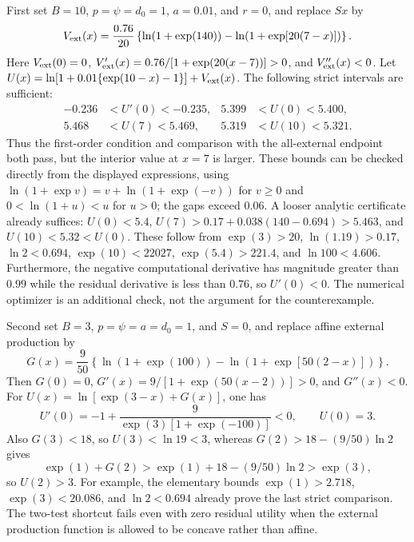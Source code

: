 \documentclass[11pt,a4paper]{article}
\theoremstyle{definition}\newtheorem{definition}{Definition}
\begin{document}
First set $B=10$, $p=\psi=d_0=1$, $a=0.01$, and $r=0$, and replace
$Sx$ by
\[
 V_{\rm ext}(x)=\frac{0.76}{20}
 \left\{\ln(1+\exp(140))-
             \ln(1+\exp[20(7-x)])\right\}.
\]
Here $V_{\rm ext}(0)=0$,
$V_{\rm ext}'(x)=0.76/[1+\exp(20(x-7))]>0$, and
$V_{\rm ext}''(x)<0$. Let
$U(x)=\ln[1+0.01\{\exp(10-x)-1\}]+V_{\rm ext}(x)$.
The following strict intervals are sufficient:
\begin{align*}
 -0.236&<U'(0)<-0.235, &5.399&<U(0)<5.400,\\
 5.468&<U(7)<5.469, &5.319&<U(10)<5.321.
\end{align*}
Thus the first-order condition and comparison with the all-external
endpoint both pass, but the interior value at $x=7$ is larger.
These bounds can be checked directly from the displayed expressions,
using $\ln(1+\exp v)=v+\ln(1+\exp(-v))$ for $v\geq0$
and $0<\ln(1+u)<u$ for $u>0$; the gaps exceed $0.06$.
A looser analytic certificate already suffices: $U(0)<5.4$,
$U(7)>0.17+0.038(140-0.694)>5.463$, and $U(10)<5.32<U(0)$.
These follow from $\exp(3)>20$, $\ln(1.19)>0.17$,
$\ln2<0.694$, $\exp(10)<22027$, $\exp(5.4)>221.4$, and
$\ln100<4.606$. Furthermore, the negative computational derivative
has magnitude greater than $0.99$ while the residual derivative is
less than $0.76$, so $U'(0)<0$. The numerical optimizer is an
additional check, not the argument for the counterexample.

Second set $B=3$, $p=\psi=a=d_0=1$, and $S=0$, and replace affine
external production by
\[
 G(x)=\frac9{50}\left\{\ln(1+\exp(100))-
                  \ln(1+\exp[50(2-x)])\right\}.
\]
Then $G(0)=0$, $G'(x)=9/[1+\exp(50(x-2))]>0$, and $G''(x)<0$.
For $U(x)=\ln[\exp(3-x)+G(x)]$, one has
\[
 U'(0)=-1+\frac{9}{\exp(3)[1+\exp(-100)]}<0,
 \qquad U(0)=3.
\]
Also $G(3)<18$, so $U(3)<\ln19<3$, whereas
$G(2)>18-(9/50)\ln2$ gives
\[
 \exp(1)+G(2)>\exp(1)+18-(9/50)\ln2>\exp(3),
\]
so $U(2)>3$. For example, the elementary bounds
$\exp(1)>2.718$, $\exp(3)<20.086$, and $\ln2<0.694$
already prove the last strict comparison. The two-test shortcut fails
even with zero residual utility when the external production function
is allowed to be concave rather than affine.
\end{document}
